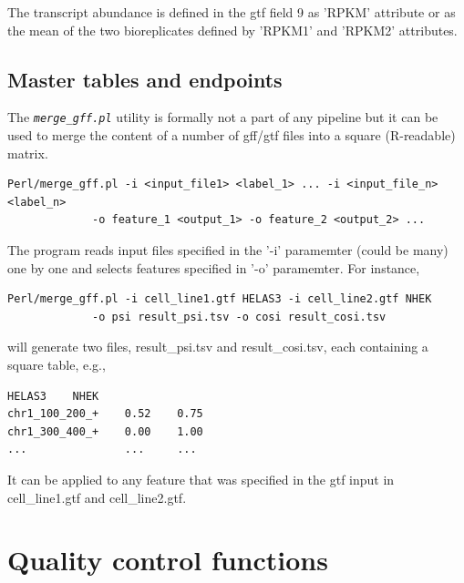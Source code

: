 \documentclass{article}
\newcommand{\prog}[1]{{\tt\em #1}}
\begin{document}
The transcript abundance is defined in the gtf field 9 as 'RPKM' attribute or as the mean of the two bioreplicates defined by
'RPKM1' and 'RPKM2' attributes.


\subsection{Master tables and endpoints}
The \prog{merge\_gff.pl} utility is formally not a part of any pipeline but it can be used to merge the content of a number of gff/gtf 
files into a square (R-readable) matrix.
\begin{verbatim}
Perl/merge_gff.pl -i <input_file1> <label_1> ... -i <input_file_n> <label_n>
             -o feature_1 <output_1> -o feature_2 <output_2> ...
\end{verbatim}
The program reads input files specified in the '-i' paramemter (could be many) one by one and selects features specified in '-o' paramemter. For instance,
\begin{verbatim}
Perl/merge_gff.pl -i cell_line1.gtf HELAS3 -i cell_line2.gtf NHEK 
             -o psi result_psi.tsv -o cosi result_cosi.tsv
\end{verbatim}
will generate two files, result\_psi.tsv and result\_cosi.tsv, each containing a square table, e.g.,
\begin{verbatim}
HELAS3    NHEK
chr1_100_200_+    0.52    0.75
chr1_300_400_+    0.00    1.00
...               ...     ...
\end{verbatim}
It can be applied to any feature that was specified in the gtf input in cell\_line1.gtf and cell\_line2.gtf.

\section{Quality control functions}
\end{document}
